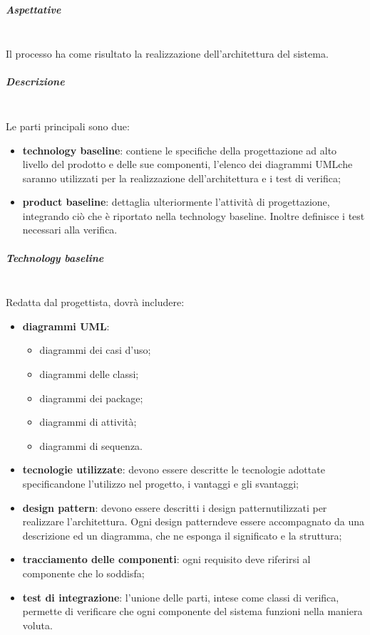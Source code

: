 			
			\subparagraph*{Aspettative} \mbox{}\\
			\noindent Il processo ha come risultato la realizzazione dell'architettura del sistema. 
			\newline
			
			\subparagraph*{Descrizione}  \mbox{}\\
			\noindent Le parti principali sono due:
				\begin{itemize}
					\item \textbf{technology baseline}: contiene le specifiche della 
						progettazione ad alto livello del prodotto e delle sue componenti, l'elenco dei 
						diagrammi UML\glosp che saranno utilizzati per la realizzazione 
						dell'architettura e i test di verifica;
					\item \textbf{product baseline}: dettaglia ulteriormente l'attività di 
						progettazione, integrando ciò che è riportato nella technology baseline. Inoltre 
						definisce i test necessari alla verifica. \newline
				\end{itemize}
			
			
			\subparagraph*{Technology baseline} \mbox{}\\
				
			\noindent Redatta dal progettista, dovrà includere:
				\begin{itemize}
					\item \textbf{diagrammi UML\glo}:
					\begin{itemize}
						\item diagrammi dei casi d'uso;
						\item diagrammi delle classi;
						\item diagrammi dei package;
						\item diagrammi di attività;
						\item diagrammi di sequenza.
					\end{itemize}
					\item \textbf{tecnologie utilizzate}: devono essere descritte le tecnologie 
						adottate specificandone l'utilizzo nel progetto, i vantaggi e gli svantaggi;
					\item \textbf{design pattern\glo}: devono essere descritti i design 
						pattern\glosp utilizzati per realizzare l'architettura. Ogni design 
						pattern\glosp deve essere accompagnato da una descrizione ed un diagramma, che 
						ne esponga il significato e la struttura;
					\item \textbf{tracciamento delle componenti}: ogni requisito deve riferirsi 
						al componente che lo soddisfa;
					\item \textbf{test di integrazione}: l'unione delle parti, intese come 
						classi di verifica, permette di verificare che ogni componente del sistema 
						funzioni nella maniera voluta. \newline
				\end{itemize}
						
